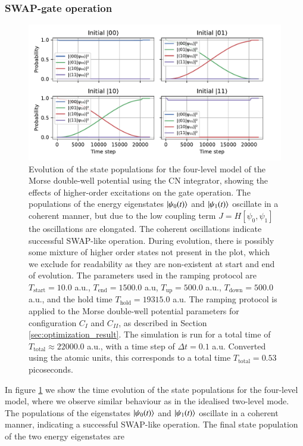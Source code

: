 \documentclass{subfiles}
\begin{document}
\subsubsection*{SWAP-gate operation}
\begin{figure}[h!]
    \centering
    \includegraphics[width=1.0\textwidth]{figs/time_evolution_4_basefunctions_2306_SWAP.pdf}
    \caption{Evolution of the state populations for the four-level model of the Morse double-well potential using the CN integrator, showing the effects of higher-order excitations on the gate operation. The populations of the energy eigenstates $\ket{\psi_0(t)}$ and $\ket{\psi_1(t)}$ oscillate in a coherent manner, but due to the low coupling term $J=H[\psi_0, \psi_1]$ the oscillations are elongated. The coherent oscillations indicate successful SWAP-like operation. During evolution, there is possibly some mixture of higher order states not present in the plot, which we exclude for readability as they are non-existent at start and end of evolution.
    The parameters used in the ramping protocol are $T_{\text{start}} = 10.0$ a.u., $T_{\text{end}} = 1500.0$ a.u, $T_{\text{up}} = 500.0$ a.u., $T_{\text{down}} = 500.0$ a.u., and the hold time $T_{\text{hold}} = 19 315.0$ a.u. The ramping protocol is applied to the Morse double-well potential parameters for configuration $C_I$ and $C_{II}$, as described in Section \ref{sec:optimization_result}. The simulation is run for a total time of $T_{\text{total}} \approx 22 000.0$ a.u., with a time step of $\Delta t = 0.1$ a.u. Converted using the atomic units, this corresponds to a total time $T_{\text{total}}=0.53$ picoseconds. 
    }
    \label{fig:time_evolution_4_basefunctions}
\end{figure}
In figure \ref{fig:time_evolution_4_basefunctions} we show the time evolution of the state populations for the four-level model, where we observe similar behaviour as in the idealised two-level mode. The populations of the eigenstates $\ket{\psi_0(t)}$ and $\ket{\psi_1(t)}$ oscillate in a coherent manner, indicating a successful SWAP-like operation. The final state population of the two energy eigenstates are
\end{document}

